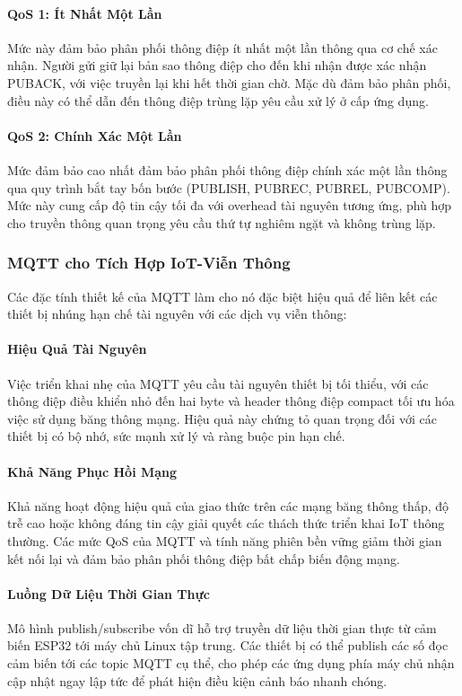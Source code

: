 \paragraph{QoS 1: Ít Nhất Một Lần}
Mức này đảm bảo phân phối thông điệp ít nhất một lần thông qua cơ chế xác nhận. Người gửi giữ lại bản sao thông điệp cho đến khi nhận được xác nhận PUBACK, với việc truyền lại khi hết thời gian chờ. Mặc dù đảm bảo phân phối, điều này có thể dẫn đến thông điệp trùng lặp yêu cầu xử lý ở cấp ứng dụng.

\paragraph{QoS 2: Chính Xác Một Lần}
Mức đảm bảo cao nhất đảm bảo phân phối thông điệp chính xác một lần thông qua quy trình bắt tay bốn bước (PUBLISH, PUBREC, PUBREL, PUBCOMP). Mức này cung cấp độ tin cậy tối đa với overhead tài nguyên tương ứng, phù hợp cho truyền thông quan trọng yêu cầu thứ tự nghiêm ngặt và không trùng lặp.

\subsubsection{MQTT cho Tích Hợp IoT-Viễn Thông}
\label{subsubsec:mqtt_iot_integration}

Các đặc tính thiết kế của MQTT làm cho nó đặc biệt hiệu quả để liên kết các thiết bị nhúng hạn chế tài nguyên với các dịch vụ viễn thông:

\paragraph{Hiệu Quả Tài Nguyên}
Việc triển khai nhẹ của MQTT yêu cầu tài nguyên thiết bị tối thiểu, với các thông điệp điều khiển nhỏ đến hai byte và header thông điệp compact tối ưu hóa việc sử dụng băng thông mạng. Hiệu quả này chứng tỏ quan trọng đối với các thiết bị có bộ nhớ, sức mạnh xử lý và ràng buộc pin hạn chế.

\paragraph{Khả Năng Phục Hồi Mạng}
Khả năng hoạt động hiệu quả của giao thức trên các mạng băng thông thấp, độ trễ cao hoặc không đáng tin cậy giải quyết các thách thức triển khai IoT thông thường. Các mức QoS của MQTT và tính năng phiên bền vững giảm thời gian kết nối lại và đảm bảo phân phối thông điệp bất chấp biến động mạng.

\paragraph{Luồng Dữ Liệu Thời Gian Thực}
Mô hình publish/subscribe vốn dĩ hỗ trợ truyền dữ liệu thời gian thực từ cảm biến ESP32 tới máy chủ Linux tập trung. Các thiết bị có thể publish các số đọc cảm biến tới các topic MQTT cụ thể, cho phép các ứng dụng phía máy chủ nhận cập nhật ngay lập tức để phát hiện điều kiện cảnh báo nhanh chóng.

